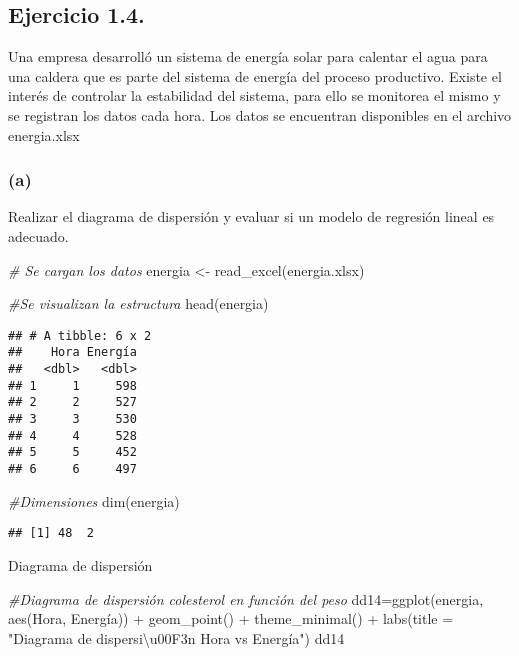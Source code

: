 \documentclass[
]{article}
\newenvironment{Shaded}{\begin{snugshade}}{\end{snugshade}}
\newcommand{\AttributeTok}[1]{\textcolor[rgb]{0.77,0.63,0.00}{#1}}
\newcommand{\CommentTok}[1]{\textcolor[rgb]{0.56,0.35,0.01}{\textit{#1}}}
\newcommand{\FunctionTok}[1]{\textcolor[rgb]{0.00,0.00,0.00}{#1}}
\newcommand{\NormalTok}[1]{#1}
\newcommand{\OtherTok}[1]{\textcolor[rgb]{0.56,0.35,0.01}{#1}}
\newcommand{\SpecialCharTok}[1]{\textcolor[rgb]{0.00,0.00,0.00}{#1}}
\newcommand{\StringTok}[1]{\textcolor[rgb]{0.31,0.60,0.02}{#1}}
\begin{document}
\hypertarget{ejercicio-1.4.}{%
\subsection{Ejercicio 1.4.}\label{ejercicio-1.4.}}

{ Una empresa desarrolló un sistema de energía solar para calentar el
agua para una caldera que es parte del sistema de energía del proceso
productivo. Existe el interés de controlar la estabilidad del sistema,
para ello se monitorea el mismo y se registran los datos cada hora. Los
datos se encuentran disponibles en el archivo energia.xlsx}

\hypertarget{a-3}{%
\subsubsection{(a)}\label{a-3}}

Realizar el diagrama de dispersión y evaluar si un modelo de regresión
lineal es adecuado.

\begin{Shaded}
\begin{Highlighting}[]
\CommentTok{\# Se cargan los datos}
\NormalTok{energia }\OtherTok{\textless{}{-}} \FunctionTok{read\_excel}\NormalTok{(}\StringTok{\textquotesingle{}energia.xlsx\textquotesingle{}}\NormalTok{)}

\CommentTok{\#Se visualizan la estructura}
\FunctionTok{head}\NormalTok{(energia)}
\end{Highlighting}
\end{Shaded}

\begin{verbatim}
## # A tibble: 6 x 2
##    Hora Energía
##   <dbl>   <dbl>
## 1     1     598
## 2     2     527
## 3     3     530
## 4     4     528
## 5     5     452
## 6     6     497
\end{verbatim}

\begin{Shaded}
\begin{Highlighting}[]
\CommentTok{\#Dimensiones}
\FunctionTok{dim}\NormalTok{(energia)}
\end{Highlighting}
\end{Shaded}

\begin{verbatim}
## [1] 48  2
\end{verbatim}

Diagrama de dispersión

\begin{Shaded}
\begin{Highlighting}[]
\CommentTok{\#Diagrama de dispersión colesterol en función del peso}
\NormalTok{dd14}\OtherTok{=}\FunctionTok{ggplot}\NormalTok{(energia, }\FunctionTok{aes}\NormalTok{(Hora, Energía)) }\SpecialCharTok{+} 
  \FunctionTok{geom\_point}\NormalTok{() }\SpecialCharTok{+} \FunctionTok{theme\_minimal}\NormalTok{() }\SpecialCharTok{+} \FunctionTok{labs}\NormalTok{(}\AttributeTok{title =} \StringTok{"Diagrama de dispersi\textbackslash{}u00F3n Hora vs Energía"}\NormalTok{)}
\NormalTok{dd14}
\end{Highlighting}
\end{Shaded}
\end{document}
